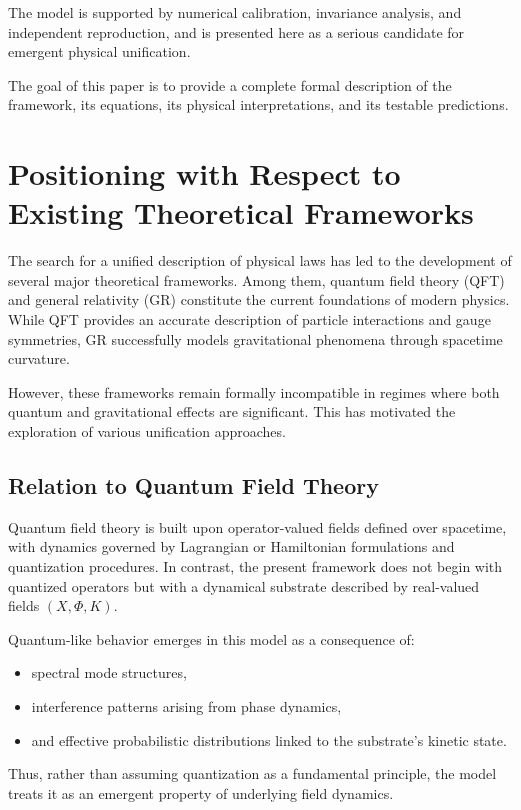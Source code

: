 \documentclass[11pt]{article}
\begin{document}
The model is supported by numerical calibration, invariance analysis, and independent reproduction, and is presented here as a serious candidate for emergent physical unification.

The goal of this paper is to provide a complete formal description of the framework, its equations, its physical interpretations, and its testable predictions.

\section{Positioning with Respect to Existing Theoretical Frameworks}

The search for a unified description of physical laws has led to the development of several major theoretical frameworks. Among them, quantum field theory (QFT) and general relativity (GR) constitute the current foundations of modern physics. While QFT provides an accurate description of particle interactions and gauge symmetries, GR successfully models gravitational phenomena through spacetime curvature.

However, these frameworks remain formally incompatible in regimes where both quantum and gravitational effects are significant. This has motivated the exploration of various unification approaches.

\subsection{Relation to Quantum Field Theory}

Quantum field theory is built upon operator-valued fields defined over spacetime, with dynamics governed by Lagrangian or Hamiltonian formulations and quantization procedures. In contrast, the present framework does not begin with quantized operators but with a dynamical substrate described by real-valued fields $(X, \Phi, K)$.

Quantum-like behavior emerges in this model as a consequence of:
\begin{itemize}
\item spectral mode structures,
\item interference patterns arising from phase dynamics,
\item and effective probabilistic distributions linked to the substrate's kinetic state.
\end{itemize}

Thus, rather than assuming quantization as a fundamental principle, the model treats it as an emergent property of underlying field dynamics.
\end{document}
